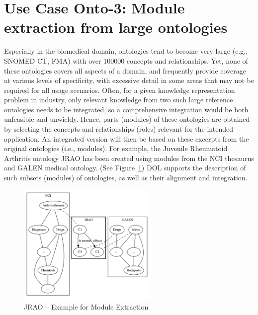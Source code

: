 \documentclass[10pt,%
\ifpretendfinal
final%
\else
draft%
\fi,
]{scrreprt}
\newcommand{\figurerefname}{Figure}
\newcommand{\fref}[1]{\figurerefname~\ref{#1}}
\begin{document}
\section{Use Case Onto-3: Module extraction from large ontologies}
Especially in the biomedical domain, ontologies tend to become very large (e.g., SNOMED CT, FMA) with over 100000 concepts and relationships. Yet, none of 
these ontologies covers all aspects of a domain, and frequently provide coverage at various levels of specificity, with excessive detail in some areas that may not 
be required for all usage scenarios. Often, for a given knowledge representation problem in industry, only relevant knowledge from two such large reference 
ontologies needs to be integrated, so a comprehensive integration would be both unfeasible and unwieldy. Hence, parts (modules) of these ontologies are obtained 
by selecting the concepts and relationships (roles) relevant for the intended application. An integrated version will then be based on these excerpts from the original 
ontologies (i.e., modules). For example, the Juvenile Rheumatoid Arthritis ontology JRAO has been created using modules from the NCI thesaurus and GALEN 
medical ontology. (See \fref{JRAO}) DOL  supports the description of such subsets (modules) of ontologies, as well as their alignment and integration.


\begin{figure}[htbp]
\begin{center}
\includegraphics[width=0.6\textwidth]{useCaseOnto3.png}
\caption{JRAO  -- Example for Module Extraction}
\label{JRAO}
\end{center}
\end{figure}

 
\end{document}
